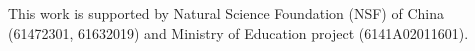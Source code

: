 \documentclass[runningheads]{llncs}
\begin{document}
This work is supported by Natural Science Foundation (NSF) of China (61472301, 61632019) and Ministry of Education project (6141A02011601).



%
%
%
 
 
%
\end{document}
